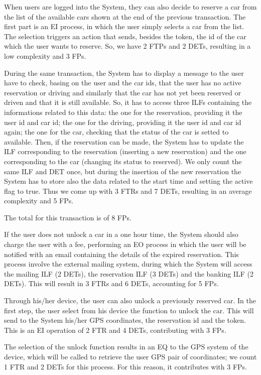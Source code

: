 When users are logged into the System, they can also decide to reserve a car from the list of the available cars shown at the end of the previous transaction.
The first part is an EI process, in which the user simply selects a car from the list. The selection triggers an action that sends, besides the token, the id of the car which the user wants to reserve. So, we have 2 FTPs and 2 DETs, resulting in a low complexity and 3 FPs.

During the same transaction, the System has to display a message to the user have to check, basing on the user and the car ids, that the user has no active reservation or driving and similarly that the car has not yet been reserved or driven and that it is still available. So, it has to access three ILFs containing the informations related to this data: the one for the reservation, providing it the user id and car id; the one for the driving, providing it the user id and car id again; the one for the car, checking that the status of the car is setted to available. Then, if the reservation can be made, the System has to update the ILF corresponding to the reservation (inserting a new reservation) and the one corresponding to the car (changing its status to reserved). We only count the same ILF and DET once, but during the insertion of the new reservation the System has to store also the data related to the start time and setting the active flag to true. Thus we come up with 3 FTRs and 7 DETs, resulting in an average complexity and 5 FPs.

The total for this transaction is of 8 FPs.
\bigskip

If the user does not unlock a car in a one hour time, the System should also charge the user with a fee, performing an EO process in which the user will be notified with an email containing the details of the expired reservation. This process involve the external mailing system, during which the System will access the mailing ILF (2 DETs), the reservation ILF (3 DETs) and the banking ILF (2 DETs). This will result in 3 FTRs and 6 DETs, accounting for 5 FPs.
\bigskip

Through his/her device, the user can also unlock a previously reserved car. 
In the first step, the user select from his device the function to unlock the car. This will send to the System his/her GPS coordinates, the reservation id and the token. This is an EI operation of 2 FTR and 4 DETs, contributing with 3 FPs.

The selection of the unlock function results in an EQ to the GPS system of the device, which will be called to retrieve the user GPS pair of coordinates; we count 1 FTR and 2 DETs for this process. For this reason, it contributes with 3 FPs.

